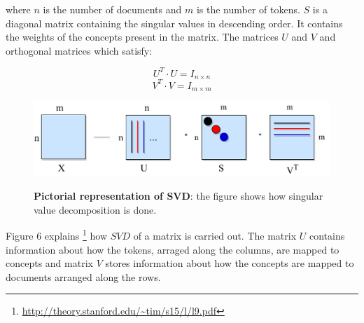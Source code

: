     where $n$ is the number of documents and $m$ is the number of tokens. $S$ is a diagonal matrix containing the singular values in descending order. It contains the weights of the concepts present in the matrix. The matrices $U$ and $V$ and orthogonal matrices which satisfy:
    
    \begin{equation}
    U^T \cdot U = I_{n \times n}
    \end{equation}
    \begin{equation}
    V^T \cdot V = I_{m \times m}
    \end{equation}
    
\begin{figure}[h]
\begin{centering}
    {\includegraphics[scale=0.8]{figures/usv.pdf}}
    \caption[Pictorial representation of SVD]{\textbf{Pictorial representation of SVD}: the figure shows how singular value decomposition is done.}
\end{centering}
\end{figure}
    
    Figure 6 explains \footnote{\url{http://theory.stanford.edu/~tim/s15/l/l9.pdf}} 
    how $SVD$ of a matrix is carried out. The matrix $U$ contains information about how the tokens, arraged along the columns, are mapped to concepts and matrix $V$ stores information about how the concepts are mapped to documents arranged along the rows. 
    
